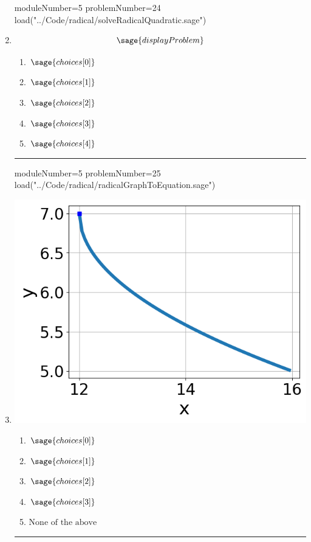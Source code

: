 \documentclass[14pt]{article}
\newcommand{\litem}[1]{\item#1\hspace*{-1cm}\rule{\textwidth}{0.4pt}}
\begin{document}
\begin{enumerate}
\begin{sagesilent}
moduleNumber=5
problemNumber=24
load("../Code/radical/solveRadicalQuadratic.sage")
\end{sagesilent}

\litem{

\[ \sage{displayProblem} \]

	\begin{enumerate}[label=\Alph*.]
		\item \( \sage{choices[0]} \)
		\item \( \sage{choices[1]} \)
		\item \( \sage{choices[2]} \)
		\item \( \sage{choices[3]} \)
		\item \( \sage{choices[4]} \)
	\end{enumerate}
}

\begin{sagesilent}
moduleNumber=5
problemNumber=25
load("../Code/radical/radicalGraphToEquation.sage")
\end{sagesilent}

\litem{
\begin{multicols}{2}
\begin{center}
\includegraphics[width=.3\textwidth]{../Figures/radicalGraphToEquationA.png}
\end{center}

\columnbreak

	\begin{enumerate}[label=\Alph*.]
		\item \( \sage{choices[0]} \)
		\item \( \sage{choices[1]} \)
		\item \( \sage{choices[2]} \)
		\item \( \sage{choices[3]} \)
    \item \( \text{None of the above} \)
	\end{enumerate}
\end{multicols}
}

\end{enumerate}
\end{document}
